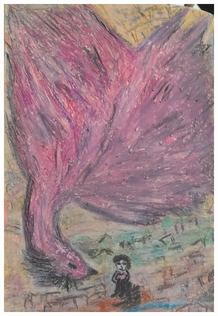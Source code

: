 \documentclass[12pt, a4paper, twoside]{book} %
\begin{document}
\begin{figure}[H]
	\centering
	\includegraphics[width=\textwidth]{./images/1f81324dd8eef5.jpg}
\end{figure}
\end{document}
